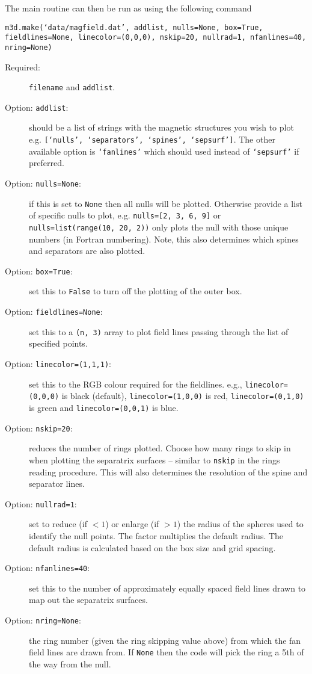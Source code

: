\documentclass[12pt]{article}
\begin{document}
      The main routine can then be run as using the following command

      \texttt{m3d.make(`data/magfield.dat', addlist, nulls=None, box=True, fieldlines=None, linecolor=(0,0,0), nskip=20, nullrad=1, nfanlines=40, nring=None)}

      \begin{description}
        \item [Required:] \texttt{filename} and \texttt{addlist}.
        \item [Option: \texttt{addlist}:] should be a list of strings with the magnetic structures you wish to plot e.g. \texttt{[`nulls', `separators', `spines', `sepsurf']}. The other available option is \texttt{`fanlines'} which should used instead of \texttt{`sepsurf'} if preferred.
        \item [Option: \texttt{nulls=None}:] if this is set to \texttt{None} then all nulls will be plotted. Otherwise provide a list of specific nulls to plot, e.g. \texttt{nulls=[2, 3, 6, 9]} or \texttt{nulls=list(range(10, 20, 2))} only plots the null with those unique numbers (in Fortran numbering). Note, this also determines which spines and separators are also plotted.
        \item [Option: \texttt{box=True}:] set this to \texttt{False} to turn off the plotting of the outer box.
        \item [Option: \texttt{fieldlines=None}:] set this to a \texttt{(n, 3)} array to plot field lines passing through the list of specified points.
        \item [Option: \texttt{linecolor=(1,1,1)}:] set this to the RGB colour required for the fieldlines. e.g., \texttt{linecolor=(0,0,0)} is black (default),  \texttt{linecolor=(1,0,0)} is red, \texttt{linecolor=(0,1,0)} is green and \texttt{linecolor=(0,0,1)} is blue.
        \item [Option: \texttt{nskip=20}:] reduces the number of rings plotted. Choose how many rings to skip in when plotting the separatrix surfaces -- similar to \texttt{nskip} in the rings reading procedure. This will also determines the resolution of the spine and separator lines.
        \item [Option: \texttt{nullrad=1}:] set to reduce (if $<1$) or enlarge (if $>1$) the radius of the spheres used to identify the null points. The factor multiplies the default radius. The default radius is calculated based on the box size and grid spacing.
        \item [Option: \texttt{nfanlines=40}:] set this to the number of approximately equally spaced field lines drawn to map out the separatrix surfaces.
        \item [Option: \texttt{nring=None}:] the ring number (given the ring skipping value above) from which the fan field lines are drawn from. If \texttt{None} then the code will pick the ring a 5th of the way from the null.
      \end{description}
\end{document}
